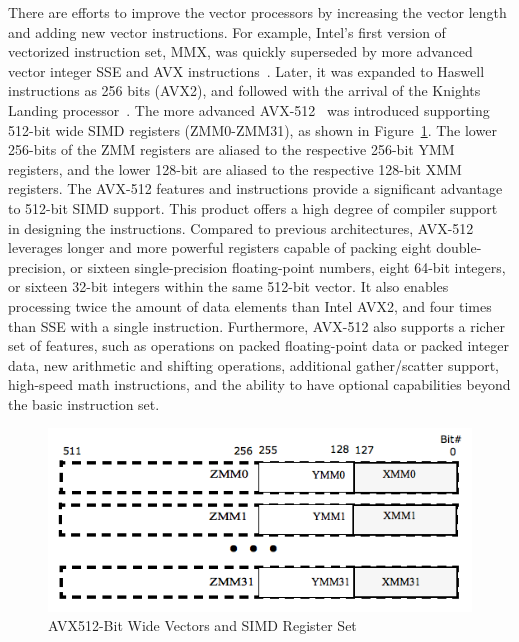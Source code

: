 \documentclass[5p,times,twocolumn]{elsarticle}
\begin{document}
There are efforts to improve the vector processors by increasing the vector
length and adding new vector instructions. For example, Intel's first version of vectorized instruction set, MMX, was quickly superseded by more advanced vector integer SSE and AVX instructions~\cite{intelsse, intelavx, avxsets}. Later, it was expanded to Haswell instructions as 256 bits (AVX2),
and followed with the arrival of the Knights Landing processor~\cite{avx-info}. The more advanced
AVX-512~\cite{Intelref} was introduced supporting 512-bit wide SIMD registers (ZMM0-ZMM31), as shown in Figure~\ref{fig:avxmms}. The lower 256-bits of the ZMM registers are
aliased to the respective 256-bit YMM registers, and the lower 128-bit are
aliased to the respective 128-bit XMM registers.
%
The AVX-512 features and instructions provide a significant advantage to 512-bit SIMD support.
This product offers a high degree of compiler support in designing the instructions.
%
Compared to previous architectures, AVX-512 leverages longer and more
powerful registers capable of packing eight double-precision, or sixteen
single-precision floating-point numbers, eight 64-bit integers, or sixteen 32-bit integers within the same 512-bit vector.
It also enables processing twice the amount of data elements than Intel AVX2, and four
times than SSE with a single instruction.
%
Furthermore, AVX-512 also supports a richer set of features, such as operations on packed
floating-point data or packed integer data, new arithmetic and shifting operations, additional
gather/scatter support, high-speed math instructions, and the ability to have
optional capabilities beyond the basic instruction set.

\begin{figure}[h]
    \centering
    \includegraphics[width=\linewidth]{avx_mms.png}
    \caption{AVX512-Bit Wide Vectors and SIMD Register Set}
    \label{fig:avxmms}
\end{figure}
\end{document}
